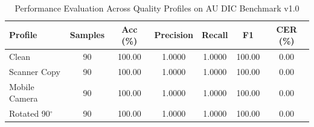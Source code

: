 \begin{table}[htbp]
\caption{Performance Evaluation Across Quality Profiles on AU DIC Benchmark v1.0}
\label{tab:profile_degradation}
\centering
\begin{tabular}{lcccccc}
\hline
\textbf{Profile} & \textbf{Samples} & \textbf{Acc (\%)} & \textbf{Precision} & \textbf{Recall} & \textbf{F1} & \textbf{CER (\%)} \\
\hline
Clean & 90 & 100.00 & 1.0000 & 1.0000 & 100.00 & 0.00 \\
Scanner Copy & 90 & 100.00 & 1.0000 & 1.0000 & 100.00 & 0.00 \\
Mobile Camera & 90 & 100.00 & 1.0000 & 1.0000 & 100.00 & 0.00 \\
Rotated 90$^\circ$ & 90 & 100.00 & 1.0000 & 1.0000 & 100.00 & 0.00 \\
\hline
\end{tabular}
\end{table}